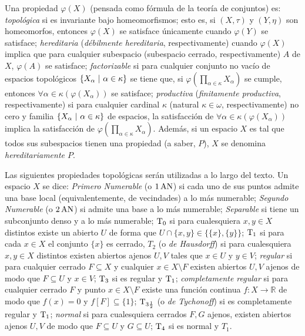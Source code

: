 Una propiedad $\varphi(X)$ (pensada como fórmula de la teoría de conjuntos) es: \textit{topológica} si es invariante bajo homeomorfismos; esto es, si $(X,\tau)$ y $(Y,\eta)$ son homeomorfos, entonces $\varphi(X)$ se satisface únicamente cuando $\varphi(Y)$ se satisface; \textit{hereditaria} (\textit{débilmente hereditaria}, respectivamente) cuando $\varphi(X)$ implica que para cualquier subespacio (subespacio cerrado, respectivamente) $A$ de $X$, $\varphi(A)$ se satisface; \textit{factorizable} si para cualquier conjunto no vacío de espacios topológicos $\{X_\alpha \text{ $|$ } \alpha \in \kappa \}$ se tiene que, si $\varphi(\prod_{\alpha \in \kappa} X_\alpha)$ se cumple, entonces $\forall \alpha \in \kappa (\varphi(X_\alpha))$ se satisface; \textit{productiva} (\textit{finitamente productiva}, respectivamente) si para cualquier cardinal $\kappa$ (natural $\kappa \in \omega$, respectivamente) no cero y familia $\{X_\alpha \text{ $|$ } \alpha \in \kappa \}$ de espacios, la satisfacción de $\forall \alpha \in \kappa (\varphi(X_\alpha))$ implica la satisfacción de $\varphi(\prod_{\alpha \in \kappa} X_\alpha)$. Además, si un espacio $X$ es tal que todos sus subespacios tienen una propiedad (a saber, $P$), $X$ se denomina \textit{hereditariamente $P$}.

Las siguientes propiedades topológicas serán utilizadas a lo largo del texto. Un espacio $X$ se dice: \textit{Primero Numerable} (o $1\operatorname{AN}$) si cada uno de sus puntos admite una base local (equivalentemente, de vecindades) a lo más numerable; \textit{Segundo Numerable} (o $2\operatorname{AN}$) si admite una base a lo más numerable; \textit{Separable} si tiene un subconjunto denso y a lo más numerable; $\operatorname{T}_0$ si para cualesquiera $x,y \in X$ distintos existe un abierto $U$ de forma que $U \cap \{x,y\} \in \{\{x\},\{y\}\}$; $\operatorname{T}_1$ si para cada $x \in X$ el conjunto $\{x\}$ es cerrado, $T_2$ (o \textit{de Hausdorff}) si para cualesquiera $x,y \in X$ distintos existen abiertos ajenos $U,V$ tales que $x \in U$ y $y \in V$; \textit{regular} si para cualquier cerrado $F \subseteq X$ y cualquier $x \in X \setminus F$ existen abiertos $U,V$ ajenos de modo que $F \subseteq U$ y $x \in V$; $\operatorname{T}_3$ si es regular y $\operatorname{T}_1$; \textit{completamente regular} si para cualquier cerrado $F$ y punto $x \in X \setminus F$ existe una función continua $f:X \to \mathbb{R}$ de modo que $f(x)=0$ y $f[F] \subseteq \{1\}$; $\operatorname{T}_{3 \frac{1}{2}}$ (o \textit{de Tychonoff}) si es completamente regular y $\operatorname{T}_1$; \textit{normal} si para cualesquiera cerrados $F,G$ ajenos, existen abiertos ajenos $U,V$ de modo que $F \subseteq U$ y $G \subseteq U$; $\operatorname{T}_4$ si es normal y $T_1$.













